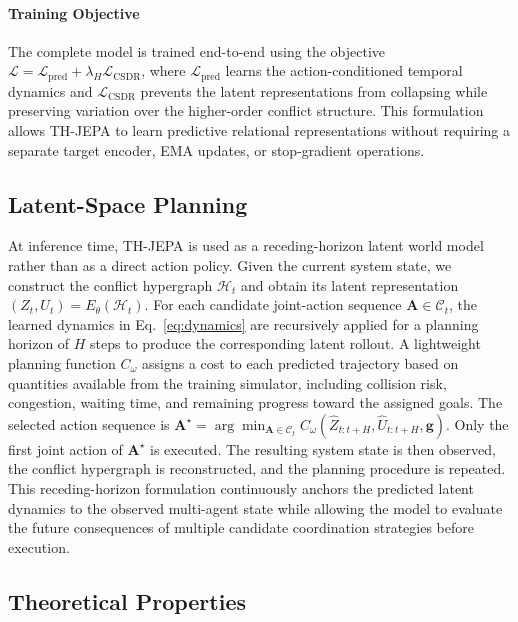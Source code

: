 \documentclass{article} %
\begin{document}
\paragraph{Training Objective}
\label{sec:objective}

The complete model is trained end-to-end using the objective
$\mathcal{L}=\mathcal{L}_{\mathrm{pred}}+\lambda_H\mathcal{L}_{\mathrm{CSDR}}$,
where $\mathcal{L}_{\mathrm{pred}}$ learns the action-conditioned temporal dynamics and $\mathcal{L}_{\mathrm{CSDR}}$ prevents the latent representations from collapsing while preserving variation over the higher-order conflict structure. This formulation allows TH-JEPA to learn predictive relational representations without requiring a separate target encoder, EMA updates, or stop-gradient operations.


\subsection{Latent-Space Planning} \label{sec:planning} At inference time, TH-JEPA is used as a receding-horizon latent world model rather than as a direct action policy. Given the current system state, we construct the conflict hypergraph $\mathcal{H}_t$ and obtain its latent representation $(Z_t,U_t)=E_\theta(\mathcal{H}_t)$. For each candidate joint-action sequence $\mathbf{A}\in\mathcal{C}_t$, the learned dynamics in Eq.~\eqref{eq:dynamics} are recursively applied for a planning horizon of $H$ steps to produce the corresponding latent rollout. A lightweight planning function $C_\omega$ assigns a cost to each predicted trajectory based on quantities available from the training simulator, including collision risk, congestion, waiting time, and remaining progress toward the assigned goals. The selected action sequence is $\mathbf{A}^{\star}=\arg\min_{\mathbf{A}\in\mathcal{C}_t} C_\omega(\widehat Z_{t:t+H},\widehat U_{t:t+H},\mathbf{g})$. Only the first joint action of $\mathbf{A}^{\star}$ is executed. The resulting system state is then observed, the conflict hypergraph is reconstructed, and the planning procedure is repeated. This receding-horizon formulation continuously anchors the predicted latent dynamics to the observed multi-agent state while allowing the model to evaluate the future consequences of multiple candidate coordination strategies before execution.







\subsection{Theoretical Properties}
\label{subsec:theory}
\end{document}

